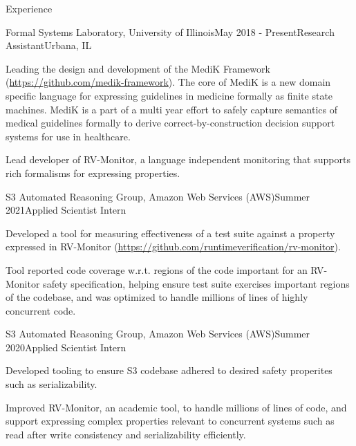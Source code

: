 \documentclass{resume} %
\begin{document}
\begin{rSection}{Experience}

\begin{rSubsection}{Formal Systems Laboratory, University of Illinois}{May 2018 - Present}{Research Assistant}{Urbana, IL}
\item Leading the design and development of the MediK Framework (\url{https://github.com/medik-framework}).
  The core of MediK is a new domain
  specific language for expressing guidelines in medicine formally as finite
  state machines. MediK is a part of a multi year effort to safely capture
  semantics of medical guidelines formally to derive correct-by-construction
  decision support systems for use in healthcare.
\item Lead developer of RV-Monitor, a language independent monitoring
  that supports rich formalisms for expressing properties.
\end{rSubsection}

  \begin{rSubsection}{S3 Automated Reasoning Group, Amazon Web Services (AWS)}{Summer 2021}{Applied Scientist Intern}{}
\item Developed a tool for measuring effectiveness of a test suite against a property expressed in
  RV-Monitor (\url{https://github.com/runtimeverification/rv-monitor}).
\item Tool reported code coverage w.r.t. regions of the code important for an
  RV-Monitor safety specification, helping ensure test suite exercises important
  regions of the codebase, and was optimized to handle millions of lines of highly
  concurrent code.
\end{rSubsection}

\begin{rSubsection}{S3 Automated Reasoning Group, Amazon Web Services (AWS)}{Summer 2020}{Applied Scientist Intern}{}
\item Developed tooling to ensure S3 codebase adhered to desired safety properites such as serializability.
\item Improved RV-Monitor, an academic tool, to handle millions of lines of
  code, and support expressing complex properties relevant to concurrent systems
    such as read after write consistency and serializability efficiently.
\end{rSubsection}


\end{rSection}
\end{document}

